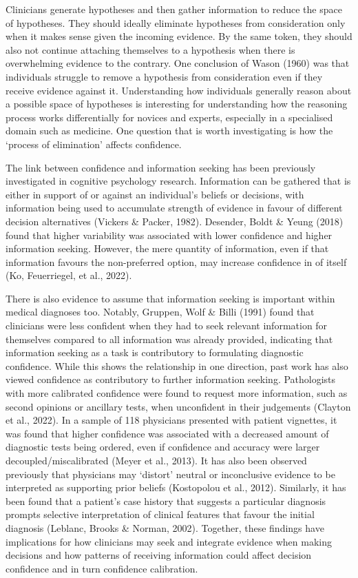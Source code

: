 \documentclass[a4paper, nobind]{templates/ociamthesis}
\begin{document}
Clinicians generate hypotheses and then gather information to reduce the space of hypotheses. They should ideally eliminate hypotheses from consideration only when it makes sense given the incoming evidence. By the same token, they should also not continue attaching themselves to a hypothesis when there is overwhelming evidence to the contrary. One conclusion of Wason (1960) was that individuals struggle to remove a hypothesis from consideration even if they receive evidence against it. Understanding how individuals generally reason about a possible space of hypotheses is interesting for understanding how the reasoning process works differentially for novices and experts, especially in a specialised domain such as medicine. One question that is worth investigating is how the `process of elimination' affects confidence.

The link between confidence and information seeking has been previously investigated in cognitive psychology research. Information can be gathered that is either in support of or against an individual's beliefs or decisions, with information being used to accumulate strength of evidence in favour of different decision alternatives (Vickers \& Packer, 1982). Desender, Boldt \& Yeung (2018) found that higher variability was associated with lower confidence and higher information seeking. However, the mere quantity of information, even if that information favours the non-preferred option, may increase confidence in of itself (Ko, Feuerriegel, et al., 2022).

There is also evidence to assume that information seeking is important within medical diagnoses too. Notably, Gruppen, Wolf \& Billi (1991) found that clinicians were less confident when they had to seek relevant information for themselves compared to all information was already provided, indicating that information seeking as a task is contributory to formulating diagnostic confidence. While this shows the relationship in one direction, past work has also viewed confidence as contributory to further information seeking. Pathologists with more calibrated confidence were found to request more information, such as second opinions or ancillary tests, when unconfident in their judgements (Clayton et al., 2022). In a sample of 118 physicians presented with patient vignettes, it was found that higher confidence was associated with a decreased amount of diagnostic tests being ordered, even if confidence and accuracy were larger decoupled/miscalibrated (Meyer et al., 2013). It has also been observed previously that physicians may `distort' neutral or inconclusive evidence to be interpreted as supporting prior beliefs (Kostopolou et al., 2012). Similarly, it has been found that a patient's case history that suggests a particular diagnosis prompts selective interpretation of clinical features that favour the initial diagnosis (Leblanc, Brooks \& Norman, 2002). Together, these findings have implications for how clinicians may seek and integrate evidence when making decisions and how patterns of receiving information could affect decision confidence and in turn confidence calibration.
\end{document}
